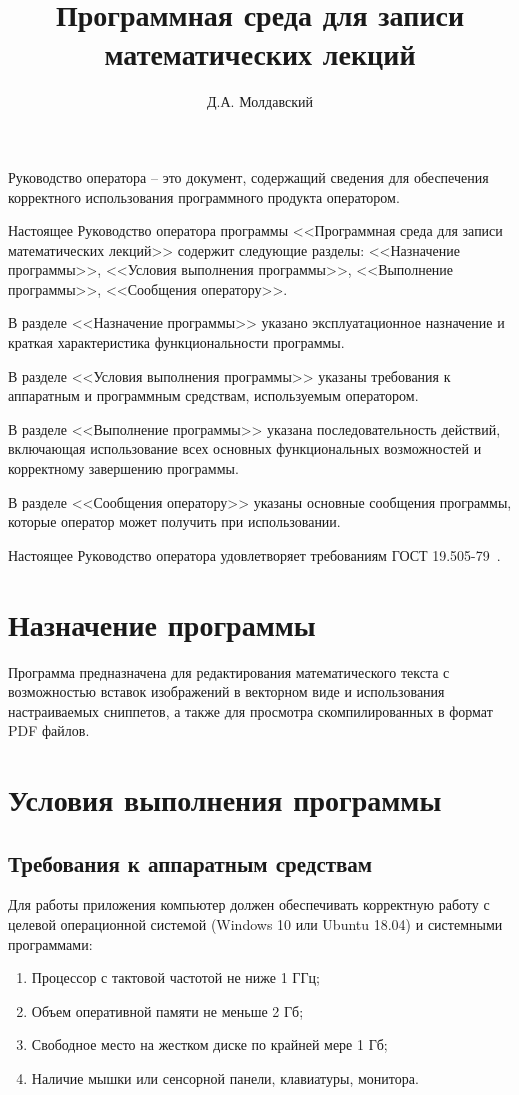 \documentclass[opermanual]{espd}
\author{Д.А. Молдавский}
\title{Программная среда для записи\\математических лекций}
\begin{document}
\annotation

Руководство оператора -- это документ, содержащий сведения для обеспечения корректного использования программного продукта оператором.

Настоящее Руководство оператора программы <<Программная среда для записи математических лекций>>  содержит следующие разделы: <<Назначение программы>>, <<Условия выполнения программы>>, <<Выполнение программы>>, <<Сообщения оператору>>.

В разделе <<Назначение программы>> указано эксплуатационное назначение и краткая характеристика функциональности программы.

В разделе <<Условия выполнения программы>> указаны требования к аппаратным и программным средствам, используемым оператором.

В разделе <<Выполнение программы>> указана последовательность действий, включающая использование всех основных функциональных возможностей и корректному завершению программы.

В разделе <<Сообщения оператору>> указаны основные сообщения программы, которые оператор может получить при использовании.

Настоящее Руководство оператора удовлетворяет требованиям ГОСТ 19.505-79~\cite{espd505}.

\tableofcontents

\section{Назначение программы}
Программа предназначена для редактирования математического текста с возможностью вставок изображений в векторном виде и использования настраиваемых сниппетов, а также для просмотра скомпилированных в формат PDF файлов.

\section{Условия выполнения программы}
\subsection{Требования к аппаратным средствам}
Для работы приложения компьютер должен обеспечивать корректную работу с целевой операционной системой (Windows 10 или Ubuntu 18.04) и системными программами:
\begin{enumerate}
\item Процессор с тактовой частотой не ниже 1 ГГц;
\item Объем оперативной памяти не меньше 2 Гб;
\item Свободное место на жестком диске по крайней мере 1 Гб;
\item Наличие мышки или сенсорной панели, клавиатуры, монитора.
\end{enumerate}
\end{document}
